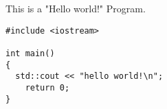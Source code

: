 \documentclass[a4paper]{article}
\begin{document}
This is a "Hello world!" Program.
\begin{verbatim}
#include <iostream>

int main()
{
  std::cout << "hello world!\n";
	return 0;
}
\end{verbatim}
\end{document}
